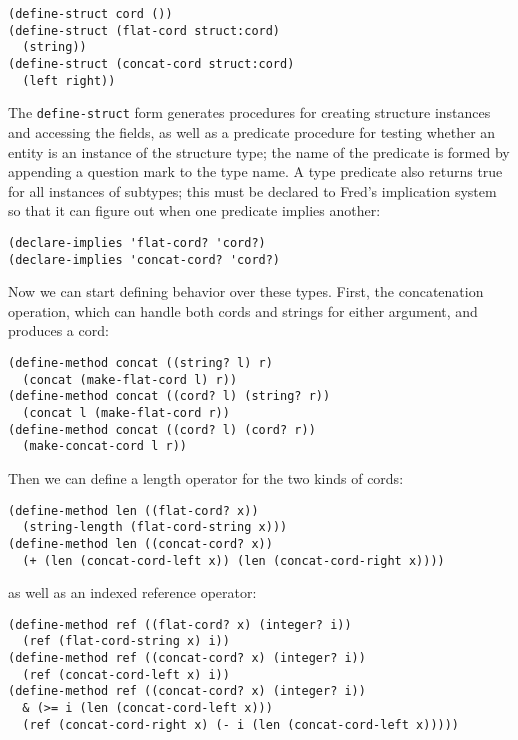 \documentclass{article}
\newcommand{\code}[1]{\texttt{#1}}
\begin{document}
\begin{verbatim}
(define-struct cord ())
(define-struct (flat-cord struct:cord)
  (string))
(define-struct (concat-cord struct:cord)
  (left right))
\end{verbatim}

The \code{define-struct} form generates procedures for creating
structure instances and accessing the fields, as well as a predicate
procedure for testing whether an entity is an instance of the
structure type; the name of the predicate is formed by appending a
question mark to the type name.  A type predicate also returns true
for all instances of subtypes; this must be declared to Fred's
implication system so that it can figure out when one predicate
implies another:

\begin{verbatim}
(declare-implies 'flat-cord? 'cord?)
(declare-implies 'concat-cord? 'cord?)
\end{verbatim}

Now we can start defining behavior over these types.  First, the
concatenation operation, which can handle both cords and strings for
either argument, and produces a cord:

\begin{verbatim}
(define-method concat ((string? l) r)
  (concat (make-flat-cord l) r))
(define-method concat ((cord? l) (string? r))
  (concat l (make-flat-cord r))
(define-method concat ((cord? l) (cord? r))
  (make-concat-cord l r))
\end{verbatim}

Then we can define a length operator for the two kinds of cords:

\begin{verbatim}
(define-method len ((flat-cord? x))
  (string-length (flat-cord-string x)))
(define-method len ((concat-cord? x))
  (+ (len (concat-cord-left x)) (len (concat-cord-right x))))
\end{verbatim}

as well as an indexed reference operator:

\begin{verbatim}
(define-method ref ((flat-cord? x) (integer? i))
  (ref (flat-cord-string x) i))
(define-method ref ((concat-cord? x) (integer? i))
  (ref (concat-cord-left x) i))
(define-method ref ((concat-cord? x) (integer? i))
  & (>= i (len (concat-cord-left x)))
  (ref (concat-cord-right x) (- i (len (concat-cord-left x)))))
\end{verbatim}
\end{document}
